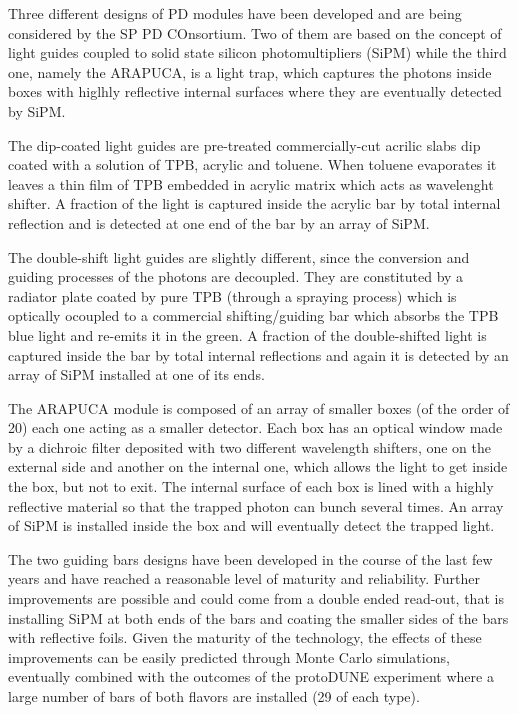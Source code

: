 Three different designs of PD modules have been developed and are being 
considered by the SP PD COnsortium. Two of them are based on the concept of 
light guides coupled to solid state silicon photomultipliers (SiPM) while the 
third one, namely the ARAPUCA, is a light trap, which captures the photons inside
boxes with 
higlhly reflective internal surfaces where they are eventually detected by 
SiPM.

The dip-coated light guides are pre-treated commercially-cut acrilic slabs dip 
coated with a solution of TPB, acrylic and toluene. When toluene evaporates it 
leaves a thin film of TPB embedded in  acrylic matrix which acts as wavelenght 
shifter. A fraction of the light is captured inside the acrylic bar by total 
internal reflection and is detected at one end of the bar by an array of SiPM.

The double-shift light guides are slightly different, since the conversion and 
guiding processes of the photons are decoupled. They are constituted by a 
radiator plate coated by pure TPB (through a spraying process) which is 
optically ocoupled to a commercial shifting/guiding bar which absorbs the TPB blue
light 
and re-emits it in the green. A fraction of the double-shifted light is 
captured 
inside the bar by total internal reflections and again it is detected by an 
array of SiPM installed at one of its ends.

The ARAPUCA module is composed of an array of smaller boxes (of the order of 
20) each one acting as a smaller detector. Each box has an optical window made 
by a dichroic filter deposited with two different wavelength shifters, one on 
the external side and another on the internal one, which allows the light to get
inside the box, but not to exit. The internal surface of each box is lined 
with a highly reflective material so that the trapped photon can bunch several 
times. An array of SiPM is installed inside the box and will eventually detect 
the trapped light.

The two guiding bars designs have been developed in the course of the last few 
years and have reached a reasonable level of maturity and reliability. Further 
improvements are possible and could come from a double ended read-out, that is 
installing SiPM at both ends of the bars and coating the smaller sides of the 
bars with reflective foils. Given the maturity of the technology, the effects 
of these improvements can be easily predicted through Monte Carlo simulations, 
eventually combined with the outcomes of the protoDUNE experiment where a 
large number of bars of both flavors are installed (29 of each type).

